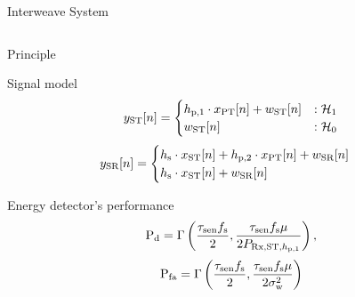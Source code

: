 \documentclass[16pt]{beamer}
\begin{document}
\begin{frame}[t]{Interweave System}
\begin{columns}
\begin{column}{0.44\columnwidth}
\begin{block}{\scriptsize Principle}
\begin{itemize}
				\end{itemize}
			\end{block}
			\vspace{-1mm}
			{
				\begin{block}{\scriptsize Signal model} %
				\begin{equation*}
					y_{\text{ST}}[n] = 
					\begin{cases}
					h_{\text{p,1}} \cdot x_{\text{PT}}[n] + w_{\text{ST}}[n] & : \mathcal{H}_1 \\
					w_{\text{ST}}[n] & :\mathcal{H}_0
					\end{cases}
				\end{equation*}
				\begin{equation*}
					\ys[n] = 
					\begin{cases}
						\hs \cdot \xs[n] + \hpt \cdot \xp[n] +  \wsr[n] & \\%
						\hs \cdot \xs[n] + \wsr[n] & %
					\end{cases}
					\label{eq_IS:sys_mod_ss}
				\end{equation*}
				\end{block}
			}
			{
			
				\vspace{-1mm}
				\begin{block}{\scriptsize Energy detector's performance} %
				\begin{equation*}
						\pd = \Gamma\left( \frac{\tsen \fsam}{2}, \frac{\tsen \fsam \mu}{2 \color{black}{\prcvdstpt}} \right), %
				\end{equation*}	
				\begin{equation*}
						\pfa = \Gamma\left( \frac{\tsen \fsam}{2}, \frac{\tsen \fsam \mu}{2 \npo} \right)%
				\end{equation*}
				\vspace{0.1em}	
				\end{block}	
			}
			{
			
}
\end{column}
\end{columns}
\end{frame}
\end{document}

